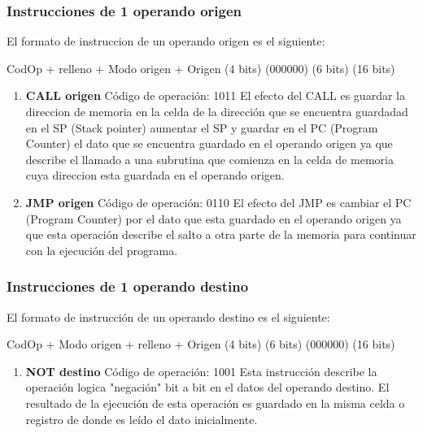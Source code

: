 \subsubsection{Instrucciones de 1 operando origen}

El formato de instruccion de un operando origen es el siguiente:

  CodOp   +   relleno   +  Modo origen +   Origen
(4 bits)      (000000)        (6 bits)    (16 bits)

\begin{enumerate}
\item \textbf{CALL origen}
Código de operación: 1011
El efecto del CALL es guardar la direccion de memoria en la celda de la dirección que se encuentra guardadad en el SP (Stack pointer) aumentar el SP y guardar en el PC (Program Counter) el dato que se encuentra guardado en el operando origen ya que describe el llamado a una subrutina que comienza en la celda de memoria cuya direccion esta guardada en el operando origen.

\item \textbf{JMP origen}
Código de operación: 0110
El efecto del JMP es cambiar el PC (Program Counter) por el dato que esta guardado en el operando origen ya que esta operación describe el salto a otra parte de la memoria para continuar con la ejecución del programa.
\end{enumerate}

\subsubsection{Instrucciones de 1 operando destino}

El formato de instrucción de un operando destino es el siguiente:

  CodOp   +  Modo origen  +  relleno  +  Origen
(4 bits)      (6 bits)      (000000)    (16 bits)

\begin{enumerate}
\item \textbf{NOT destino}
Código de operación: 1001
Esta instrucción describe la operación logica "negación" bit a bit en el datos del operando destino. El resultado de la ejecución de esta operación es guardado en la misma celda o registro de donde es leído el dato inicialmente.
\end{enumerate}


